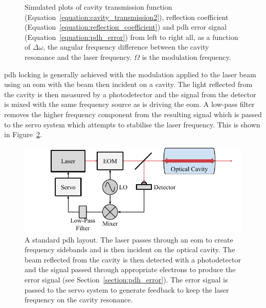 \begin{figure}
\centering

\caption[Simulated cavity transmission and reflection, and \gls{pdh} error spectra.]{Simulated plots of cavity transmission function (Equation~\ref{equation:cavity_transmission2}), reflection coefficient (Equation~\ref{equation:reflection_coefficient}) and \gls{pdh} error signal (Equation~\ref{equation:pdh_error}) from left to right all, as a function of $\Delta\omega$, the angular frequency difference between the cavity resonance and the laser frequency. $\Omega$ is the modulation frequency.}
\label{figure:pdh_plots}
\end{figure}

\Gls{pdh} locking is generally achieved with the modulation applied to the laser beam using an \gls{eom} with the beam then incident on a cavity.
The light reflected from the cavity is then measured by a photodetector and the signal from the detector is mixed with the same frequency source as is driving the \gls{eom}.
A low-pass filter removes the higher frequency component from the resulting signal which is passed to the servo system which attempts to stabilise the laser frequency.
This is shown in Figure~\ref{figure:pdh_schematic}.

\begin{figure}
\centering
\includegraphics{part1/Figs/PDH.pdf}
\caption[Pound-Drever-Hall frequency stabilisation setup.]{A standard \gls{pdh} layout.
The laser passes through an \gls{eom} to create frequency sidebands and is then incident on the optical cavity.
The beam reflected from the cavity is then detected with a photodetector and the signal passed through appropriate electrons to produce the error signal (see Section~\ref{section:pdh_error}).
The error signal is passed to the servo system to generate feedback to keep the laser frequency on the cavity resonance.}
\label{figure:pdh_schematic}
\end{figure}



